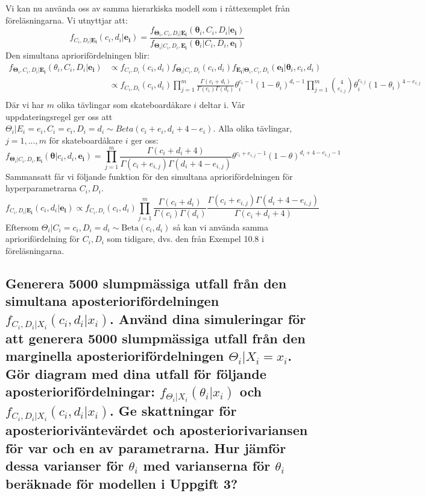 \documentclass{article}
\begin{document}
Vi kan nu använda oss av samma hierarkiska modell som i råttexemplet från föreläsningarna. Vi utnyttjar att:
\[
    f_{C_i, D_i | \mathbf{E_i}}(c_i, d_i | \mathbf{e_i}) = \frac{f_{\mathbf{\Theta}_i, C_i, D_i | \mathbf{E_i}}(\mathbf{\theta}_i, C_i, D_i | \mathbf{e_i})}{f_{\mathbf{\Theta}_i | C_i, D_i, \mathbf{E_i}}(\mathbf{\theta}_i | C_i, D_i, \mathbf{e_i})}
\]
Den simultana apriorifördelningen blir:
\begin{align*}
    f_{\mathbf{\Theta}_i, C_i, D_i | \mathbf{E_i}}(\theta_i, C_i, D_i | \mathbf{e_i}) &\propto f_{C_i, D_i}(c_i, d_i) f_{\mathbf{\Theta}_i | C_i, D_i}(c_i, d_i) f_{\mathbf{E_i} | \mathbf{\Theta}_i, C_i, D_i}(\mathbf{e_i} | \mathbf{\theta}_i, c_i, d_i) \\
    &\propto f_{C_i, D_i}(c_i, d_i) \prod\limits_{j=1}^m \frac{\Gamma(c_i + d_i)}{\Gamma(c_i) \Gamma(d_i)} \theta_i^{c_i-1} (1-\theta_i)^{d_i-1} \prod\limits_{j=1}^m \binom{4}{e_{i,j}} \theta_i^{e_{i,j}} (1-\theta_i)^{4-e_{i,j}} \\
\end{align*}
Där vi har $m$ olika tävlingar som skateboardåkare $i$ deltar i. Vår uppdateringsregel ger oss att $\Theta_i | E_i = e_i, C_i = c_i, D_i = d_i \sim Beta(c_i + e_i, d_i + 4 - e_i)$.
Alla olika tävlingar, $j = 1, ..., m$ för skateboardåkare $i$ ger oss:
\[
    f_{\mathbf{\Theta}_i | C_i, D_i, \mathbf{E_i}}(\mathbf{\theta} | c_i, d_i, \mathbf{e_i}) = \prod\limits_{j=1}^{m} \frac{\Gamma(c_i + d_i + 4)}{\Gamma(c_i + e_{i,j}) \Gamma(d_i + 4 - e_{i,j})} \theta^{c_i + e_{i,j} - 1} (1-\theta)^{d_i + 4 - e_{i,j} - 1}
\]
Sammansatt får vi följande funktion för den simultana apriorifördelningen för hyperparametrarna $C_i, D_i$.
\[
    f_{C_i, D_i | \mathbf{E_i}}(c_i, d_i | \mathbf{e_i}) \propto f_{C_i, D_i}(c_i, d_i) \prod\limits_{j=1}^m \frac{\Gamma(c_i + d_i)}{\Gamma(c_i) \Gamma(d_i)} \frac{\Gamma(c_i + e_{i,j}) \Gamma(d_i + 4 - e_{i,j})}{\Gamma(c_i + d_i + 4)}
\]
Eftersom $\Theta_i | C_i = c_i, D_i = d_i \sim \text{Beta}(c_i, d_i)$ så kan vi använda samma apriorifördelning för $C_i, D_i$ som tidigare, dvs. den från Exempel 10.8 i föreläsningarna.

\subsection{Generera 5000 slumpmässiga utfall från den simultana aposteriorifördelningen $f_{C_i, D_i | X_i}(c_i, d_i | x_i)$.
Använd dina simuleringar för att generera 5000 slumpmässiga utfall från den marginella aposteriorifördelningen $\Theta_i | X_i = x_i$.
Gör diagram med dina utfall för följande aposteriorifördelningar: $f_{\Theta_i | X_i}(\theta_i | x_i)$ och $f_{C_i, D_i | X_i}(c_i, d_i | x_i)$.
Ge skattningar för aposterioriväntevärdet och aposteriorivariansen för var och en av parametrarna.
Hur jämför dessa varianser för $\theta_i$ med varianserna för $\theta_i$ beräknade för modellen i Uppgift 3?}
\end{document}
